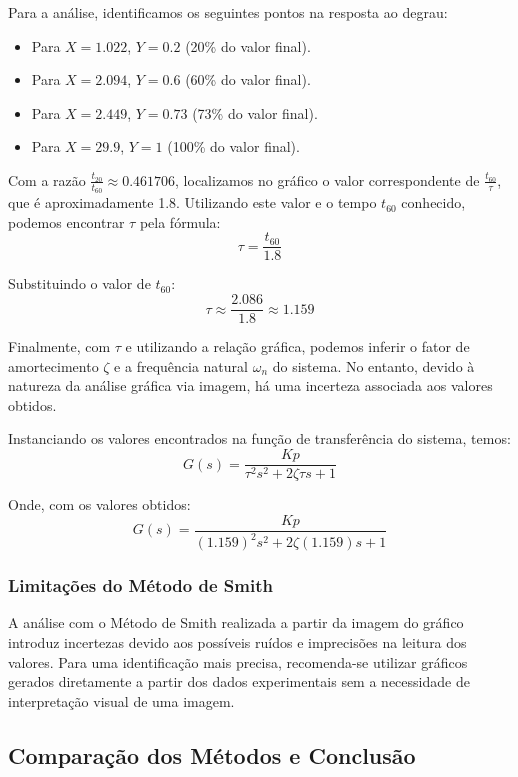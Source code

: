 Para a análise, identificamos os seguintes pontos na resposta ao degrau:
\begin{itemize}
    \item Para \(X = 1.022\), \(Y = 0.2\) (20\% do valor final).
    \item Para \(X = 2.094\), \(Y = 0.6\) (60\% do valor final).
    \item Para \(X = 2.449\), \(Y = 0.73\) (73\% do valor final).
    \item Para \(X = 29.9\), \(Y = 1\) (100\% do valor final).
\end{itemize}

Com a razão \(\frac{t_{20}}{t_{60}} \approx 0.461706\), localizamos no gráfico o valor correspondente de \(\frac{t_{60}}{\tau}\), que é aproximadamente 1.8. Utilizando este valor e o tempo \(t_{60}\) conhecido, podemos encontrar \(\tau\) pela fórmula:
\[
    \tau = \frac{t_{60}}{1.8}
\]

Substituindo o valor de \(t_{60}\):
\[
    \tau \approx \frac{2.086}{1.8} \approx 1.159
\]

Finalmente, com \(\tau\) e utilizando a relação gráfica, podemos inferir o fator de amortecimento \(\zeta\) e a frequência natural \(\omega_n\) do sistema. No entanto, devido à natureza da análise gráfica via imagem, há uma incerteza associada aos valores obtidos.

Instanciando os valores encontrados na função de transferência do sistema, temos:
\[
    G(s) = \frac{Kp}{\tau^2 s^2 + 2 \zeta \tau s + 1}
\]

Onde, com os valores obtidos:
\[
    G(s) = \frac{Kp}{(1.159)^2 s^2 + 2 \zeta (1.159) s + 1}
\]


\subsubsection{Limitações do Método de Smith}

A análise com o Método de Smith realizada a partir da imagem do gráfico introduz incertezas devido aos possíveis ruídos e imprecisões na leitura dos valores. Para uma identificação mais precisa, recomenda-se utilizar gráficos gerados diretamente a partir dos dados experimentais sem a necessidade de interpretação visual de uma imagem.



\subsection{Comparação dos Métodos e Conclusão}


